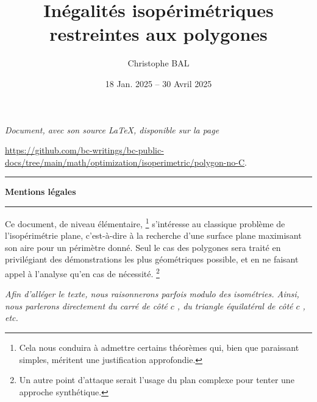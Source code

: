 \documentclass[12pt]{amsart}
\begin{document}
\title{Inégalités isopérimétriques restreintes aux polygones}
\author{Christophe BAL}
\date{18 Jan. 2025 -- 30 Avril 2025}

\maketitle

\begin{center}
	\itshape
	Document, avec son source \LaTeX, disponible sur la page

	\url{https://github.com/bc-writings/bc-public-docs/tree/main/math/optimization/isoperimetric/polygon-no-C}.
\end{center}


\bigskip


\begin{center}
	\hrule\vspace{.3em}
	{
		\fontsize{1.35em}{1em}\selectfont
		\textbf{Mentions \og légales \fg}
	}

	\vspace{0.45em}
	\doclicenseThis
	\hrule
\end{center}



\setcounter{tocdepth}{2}
\tableofcontents




\newpage

\begin{meta-abstract*}
	Ce document, de niveau élémentaire,%
	\footnote{
    	Cela nous conduira à admettre certains théorèmes qui, bien que paraissant simples, méritent une justification approfondie.
	}
	s'intéresse au classique problème de l'isopérimétrie plane, c'est-à-dire à la recherche d'une surface plane maximisant son aire pour un périmètre donné.
	Seul le cas des polygones sera traité en privilégiant des démonstrations les plus géométriques possible, et en ne faisant appel à l'analyse qu'en cas de nécessité.%
	\footnote{
    	Un autre point d'attaque serait l'usage du plan complexe pour tenter une approche synthétique.
	}
\end{meta-abstract*}


\begin{tcolorbox}
    \itshape\small
    Afin d'alléger le texte, nous raisonnerons parfois modulo des isométries. Ainsi, nous parlerons directement du \og carré de côté \( c \) \fg, du \og triangle équilatéral de côté \( c \) \fg, etc.
\end{tcolorbox}


\end{document}
